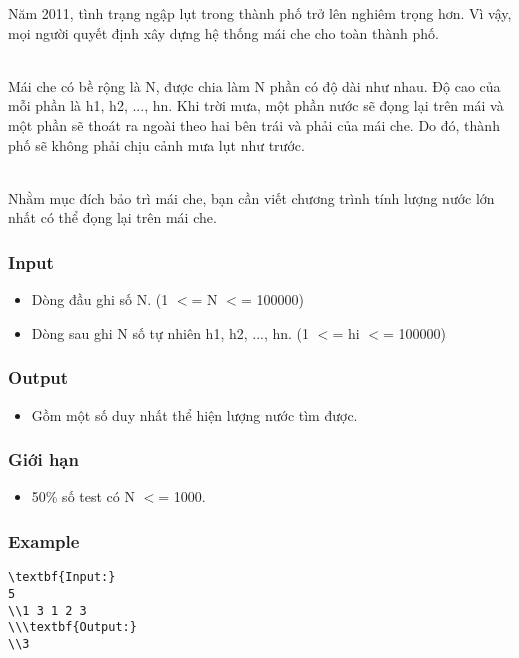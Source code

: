 



   Năm 2011, tình trạng ngập lụt trong thành phố trở lên nghiêm trọng hơn. Vì vậy, mọi người quyết định xây dựng hệ thống mái che cho toàn thành phố.  


\\   Mái che có bề rộng là N, được chia làm N phần có độ dài như nhau. Độ cao của mỗi phần là h1, h2, ..., hn. Khi trời mưa, một phần nước sẽ đọng lại trên mái và một phần sẽ thoát ra ngoài theo hai bên trái và phải của mái che. Do đó, thành phố sẽ không phải chịu cảnh mưa lụt như trước.  


\\   Nhằm mục đích bảo trì mái che, bạn cần viết chương trình tính lượng nước lớn nhất có thể đọng lại trên mái che.  

\subsubsection{   Input  }
\begin{itemize}
	\item     Dòng đầu ghi số N. (1 $<$= N $<$= 100000)   
\end{itemize}
\begin{itemize}
	\item     Dòng sau ghi N số tự nhiên h1, h2, ..., hn. (1 $<$= hi $<$= 100000)   
\end{itemize}

\subsubsection{   Output  }
\begin{itemize}
	\item     Gồm một số duy nhất thể hiện lượng nước tìm được.   
\end{itemize}

\subsubsection{   Giới hạn  }
\begin{itemize}
	\item     50\% số test có N $<$= 1000.   
\end{itemize}

\subsubsection{   Example  }
\begin{verbatim}
\textbf{Input:}
5
\\1 3 1 2 3
\\\textbf{Output:}
\\3\end{verbatim}